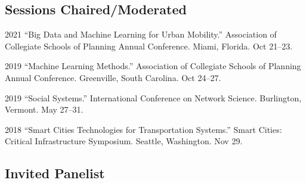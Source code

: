 \documentclass[11pt,letterpaper]{report}
\begin{document}
    \subsection*{Sessions Chaired/Moderated}

    \begin{tablist}

        \item[2021] \tab{}\enquote{Big Data and Machine Learning for Urban Mobility.} Association of Collegiate Schools of Planning Annual Conference. Miami, Florida. Oct 21--23.

        \item[2019] \tab{}\enquote{Machine Learning Methods.} Association of Collegiate Schools of Planning Annual Conference. Greenville, South Carolina. Oct 24--27.

        \item[2019] \tab{}\enquote{Social Systems.} International Conference on Network Science. Burlington, Vermont. May 27--31.

        \item[2018] \tab{}\enquote{Smart Cities Technologies for Transportation Systems.} Smart Cities: Critical Infrastructure Symposium. Seattle, Washington. Nov 29.

    \end{tablist}

    \subsection*{Invited Panelist}
\end{document}
